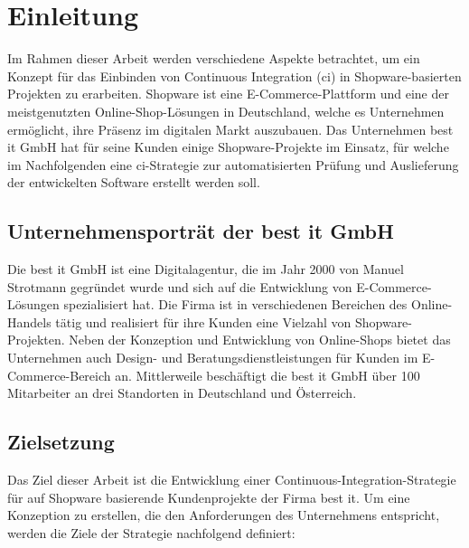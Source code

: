 
\section{Einleitung} \label{sec:01-introduction}

Im Rahmen dieser Arbeit werden verschiedene Aspekte betrachtet, um ein Konzept für das Einbinden von
Continuous Integration (\acrshort{ci}) in Shopware-basierten Projekten zu erarbeiten.
Shopware ist eine E-Commerce-Plattform und eine der meistgenutzten Online-Shop-Lösungen in
Deutschland, welche es Unternehmen ermöglicht, ihre Präsenz im digitalen Markt
auszubauen.
Das Unternehmen best it GmbH hat für seine Kunden einige Shopware-Projekte im Einsatz, für welche im Nachfolgenden
eine \acrshort{ci}-Strategie zur automatisierten Prüfung und Auslieferung der entwickelten Software erstellt werden soll.

\subsection{Unternehmensporträt der best it GmbH} \label{subsec:01-introduction-1}

Die best it GmbH ist eine Digitalagentur, die im Jahr 2000 von Manuel Strotmann gegründet wurde und sich auf die
Entwicklung von E-Commerce-Lösungen spezialisiert hat.
Die Firma ist in verschiedenen Bereichen des Online-Handels tätig und realisiert für ihre Kunden eine Vielzahl von
Shopware-Projekten.
Neben der Konzeption und Entwicklung von Online-Shops bietet das Unternehmen auch Design- und
Beratungsdienstleistungen für Kunden im E-Commerce-Bereich an.
Mittlerweile beschäftigt die best it GmbH über 100 Mitarbeiter an drei Standorten in Deutschland und Österreich.

\subsection{Zielsetzung} \label{subsec:01-introduction-2}

Das Ziel dieser Arbeit ist die Entwicklung einer Continuous-Integration-Strategie für auf Shopware basierende
Kundenprojekte der Firma best it.
Um eine Konzeption zu erstellen, die den Anforderungen des Unternehmens entspricht, werden die Ziele der Strategie
nachfolgend definiert:


